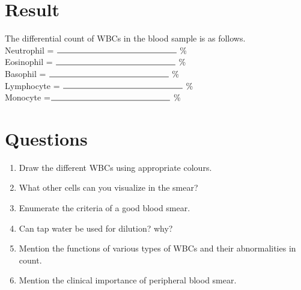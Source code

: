 \documentclass[a4paper,12pt,openany,oneside]{book}
\begin{document}
							\section*{Result}
							The differential count of WBCs in the blood sample is as follows.\vspace{.5cm}\\
							Neutrophil = $\rule{5cm}{0.5pt}$ \%\vspace{.5cm}\\
							Eosinophil = $\rule{5cm}{0.5pt}$ \%\vspace{.5cm}\\
							Basophil = $\rule{5cm}{0.5pt}$ \%\vspace{.5cm}\\
							Lymphocyte = $\rule{5cm}{0.5pt}$ \%\vspace{.5cm}\\
							Monocyte =$\rule{5cm}{0.5pt}$ \%

							\section*{Questions}
							\begin{enumerate}
								\item{Draw the different WBCs using appropriate colours.}
								\item{What other cells can you visualize in the smear?}
								\item{Enumerate the criteria of a good blood smear.}
								\item{Can tap water be used for dilution? why?}
								\item{Mention the functions of various types of WBCs and their abnormalities in count.}
								\item{Mention the clinical importance of peripheral blood smear.}
							\end{enumerate}

							\newpage
\end{document}
